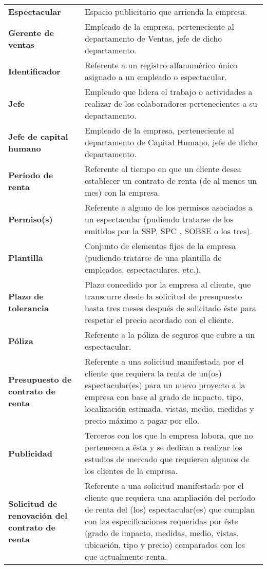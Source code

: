 \begin{longtable}[H]{m{4cm}m{8cm}}
\textbf{Espectacular} & Espacio publicitario que arrienda la empresa. \tabularnewline

\textbf{Gerente de ventas} & Empleado de la empresa, perteneciente al departamento de Ventas, jefe de dicho departamento. \tabularnewline

\textbf{Identificador} & Referente a un registro alfanumérico único asignado a un empleado o espectacular. \tabularnewline

\textbf{Jefe} & Empleado que lidera el trabajo o actividades a realizar de los colaboradores pertenecientes a su departamento. \tabularnewline

\textbf{Jefe de capital humano} & Empleado de la empresa, perteneciente al departamento de Capital Humano, jefe de dicho departamento. \tabularnewline

\textbf{Período de renta} & Referente al tiempo en que un cliente desea establecer un contrato de renta (de al menos un mes) con la empresa. \tabularnewline

\textbf{Permiso(s)} & Referente a alguno de los permisos asociados a un espectacular (pudiendo tratarse de los emitidos por la SSP, SPC , SOBSE o los tres). \tabularnewline

\textbf{Plantilla} & Conjunto de elementos fijos de la empresa (pudiendo tratarse de una plantilla de empleados, espectaculares, etc.). \tabularnewline

\textbf{Plazo de tolerancia} & Plazo concedido por la empresa al cliente, que transcurre desde la solicitud de presupuesto hasta tres meses después de solicitado éste para respetar el precio acordado con el cliente.\tabularnewline

\textbf{Póliza} & Referente a la póliza de seguros que cubre a un espectacular. \tabularnewline

\textbf{Presupuesto de contrato de renta} & Referente a una solicitud manifestada por el cliente que requiera la renta de un(os) espectacular(es) para un nuevo proyecto a la empresa con base al grado de impacto, tipo, localización estimada, vistas, medio, medidas y precio máximo a pagar por ello.\tabularnewline

\textbf{Publicidad} & Terceros con los que la empresa labora, que no pertenecen a ésta y se dedican a realizar los estudios de mercado que requieren algunos de los clientes de la empresa.\tabularnewline

\textbf{Solicitud de renovación del contrato de renta} & Referente a una solicitud manifestada por el cliente que requiera una ampliación del período de renta del (los) espectacular(es) que cumplan con las especificaciones requeridas por éste (grado de impacto, medidas, medio, vistas, ubicación, tipo y precio) comparados con los que actualmente renta.\tabularnewline


\end{longtable}
